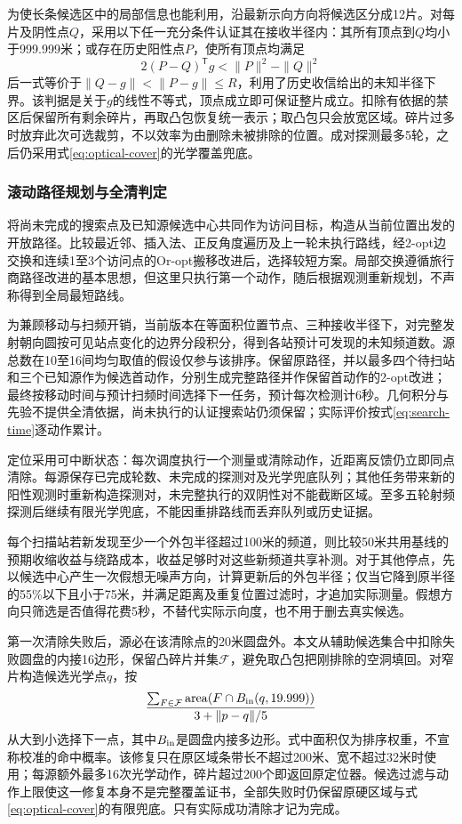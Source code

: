 为使长条候选区中的局部信息也能利用，沿最新示向方向将候选区分成12片。对每片及阴性点$Q$，采用以下任一充分条件认证其在接收半径内：其所有顶点到$Q$均小于999.999米；或存在历史阳性点$P$，使所有顶点均满足
\begin{equation}
 2(P-Q)^{\mathsf T}g<\|P\|^2-\|Q\|^2
 \label{eq:relative-reception}
\end{equation}
后一式等价于$\|Q-g\|<\|P-g\|\le R$，利用了历史收信给出的未知半径下界。该判据是关于$g$的线性不等式，顶点成立即可保证整片成立。扣除有依据的禁区后保留所有剩余碎片，再取凸包恢复统一表示；取凸包只会放宽区域。碎片过多时放弃此次可选裁剪，不以效率为由删除未被排除的位置。成对探测最多5轮，之后仍采用式\eqref{eq:optical-cover}的光学覆盖兜底。

\subsubsection{滚动路径规划与全清判定}
将尚未完成的搜索点及已知源候选中心共同作为访问目标，构造从当前位置出发的开放路径。比较最近邻、插入法、正反角度遍历及上一轮未执行路线，经2-opt边交换和连续1至3个访问点的Or-opt搬移改进后，选择较短方案。局部交换遵循旅行商路径改进的基本思想\cite{croes1958}，但这里只执行第一个动作，随后根据观测重新规划，不声称得到全局最短路线。

为兼顾移动与扫频开销，当前版本在等面积位置节点、三种接收半径下，对完整发射朝向圆按可见站点变化的边界分段积分，得到各站预计可发现的未知频道数。源总数在10至16间均匀取值的假设仅参与该排序。保留原路径，并以最多四个待扫站和三个已知源作为候选首动作，分别生成完整路径并作保留首动作的2-opt改进；最终按移动时间与预计扫频时间选择下一任务，预计每次检测计6秒。几何积分与先验不提供全清依据，尚未执行的认证搜索站仍须保留；实际评价按式\eqref{eq:search-time}逐动作累计。

定位采用可中断状态：每次调度执行一个测量或清除动作，近距离反馈仍立即同点清除。每源保存已完成轮数、未完成的探测对及光学兜底队列；其他任务带来新的阳性观测时重新构造探测对，未完整执行的双阴性对不能截断区域。至多五轮射频探测后继续有限光学兜底，不能因重排路线而丢弃队列或历史证据。

每个扫描站若新发现至少一个外包半径超过100米的频道，则比较50米共用基线的预期收缩收益与绕路成本，收益足够时对这些新频道共享补测。对于其他停点，先以候选中心产生一次假想无噪声方向，计算更新后的外包半径；仅当它降到原半径的55\%以下且小于75米，并满足距离及重复位置过滤时，才追加实际测量。假想方向只筛选是否值得花费5秒，不替代实际示向度，也不用于删去真实候选。

第一次清除失败后，源必在该清除点的20米圆盘外。本文从辅助候选集合中扣除失败圆盘的内接16边形，保留凸碎片并集$\mathcal F$，避免取凸包把刚排除的空洞填回。对窄片构造候选光学点$q$，按
\begin{equation}
 \frac{\sum_{F\in\mathcal F}\operatorname{area}(F\cap B_{\rm in}(q,19.999))}
 {3+\|p-q\|/5}
 \label{eq:unionmass}
\end{equation}
从大到小选择下一点，其中$B_{\rm in}$是圆盘内接多边形。式中面积仅为排序权重，不宣称校准的命中概率。该修复只在原区域条带长不超过200米、宽不超过32米时使用；每源额外最多16次光学动作，碎片超过200个即返回原定位器。候选过滤与动作上限使这一修复本身不是完整覆盖证书，全部失败时仍保留原硬区域与式\eqref{eq:optical-cover}的有限兜底。只有实际成功清除才记为完成。

